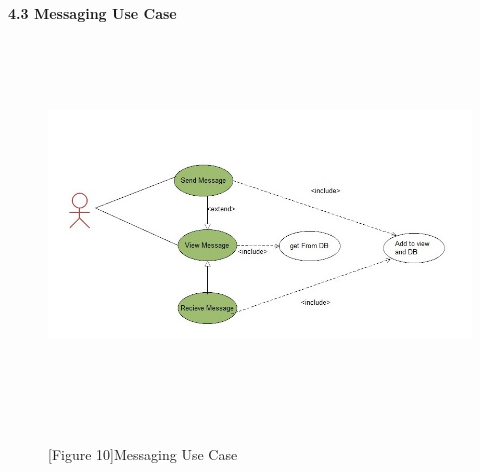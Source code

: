 \documentclass[29pt,a4paper]{moderncv}
\begin{document}
\newpage
	\\ \left\textbf{4.3 Messaging Use Case} \\
		\begin{figure}
			\centering
			\\ \includegraphics[width=6.0in, height=3.5in]{./messagingUseCase.jpg}
			\\\caption{[Figure 10]Messaging Use Case}\\
		\end{figure}
		
		\newpage
		
\end{document}
